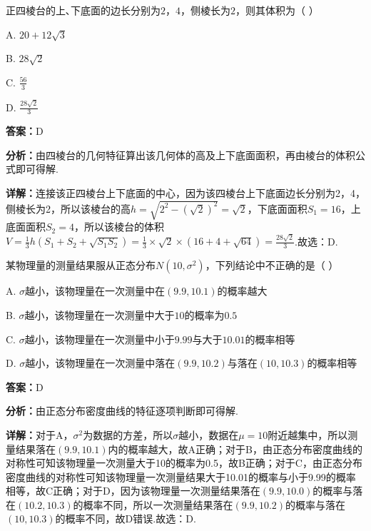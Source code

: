 \begin{question}[points=5]
正四棱台的上､下底面的边长分别为$2$，$4$，侧棱长为$2$，则其体积为（ ）
\begin{choices}
  \item A. $20+12\sqrt{3}$
  \item B. $28\sqrt{2}$
  \item C. $\frac{56}{3}$
  \item D. $\frac{28\sqrt{2}}{3}$
\end{choices}
\begin{solution}
\textbf{答案：}D

\textbf{分析：}由四棱台的几何特征算出该几何体的高及上下底面面积，再由棱台的体积公式即可得解.

\textbf{详解：}连接该正四棱台上下底面的中心，因为该四棱台上下底面边长分别为2，4，侧棱长为2，所以该棱台的高$h=\sqrt{2^2-(\sqrt{2})^2}=\sqrt{2}$，下底面面积$S_1=16$，上底面面积$S_2=4$，所以该棱台的体积$V=\frac{1}{3}h(S_1+S_2+\sqrt{S_1S_2})=\frac{1}{3}\times\sqrt{2}\times(16+4+\sqrt{64})=\frac{28\sqrt{2}}{3}$.故选：D.
\end{solution}
\end{question}

\begin{question}[points=5]
某物理量的测量结果服从正态分布$N(10,\sigma^2)$，下列结论中不正确的是（ ）
\begin{choices}
  \item A. $\sigma$越小，该物理量在一次测量中在$(9.9,10.1)$的概率越大
  \item B. $\sigma$越小，该物理量在一次测量中大于$10$的概率为$0.5$
  \item C. $\sigma$越小，该物理量在一次测量中小于$9.99$与大于$10.01$的概率相等
  \item D. $\sigma$越小，该物理量在一次测量中落在$(9.9,10.2)$与落在$(10,10.3)$的概率相等
\end{choices}
\begin{solution}
\textbf{答案：}D

\textbf{分析：}由正态分布密度曲线的特征逐项判断即可得解.

\textbf{详解：}对于A，$\sigma^2$为数据的方差，所以$\sigma$越小，数据在$\mu=10$附近越集中，所以测量结果落在$(9.9,10.1)$内的概率越大，故A正确；对于B，由正态分布密度曲线的对称性可知该物理量一次测量大于10的概率为0.5，故B正确；对于C，由正态分布密度曲线的对称性可知该物理量一次测量结果大于10.01的概率与小于9.99的概率相等，故C正确；对于D，因为该物理量一次测量结果落在$(9.9,10.0)$的概率与落在$(10.2,10.3)$的概率不同，所以一次测量结果落在$(9.9,10.2)$的概率与落在$(10,10.3)$的概率不同，故D错误.故选：D.
\end{solution}
\end{question}

